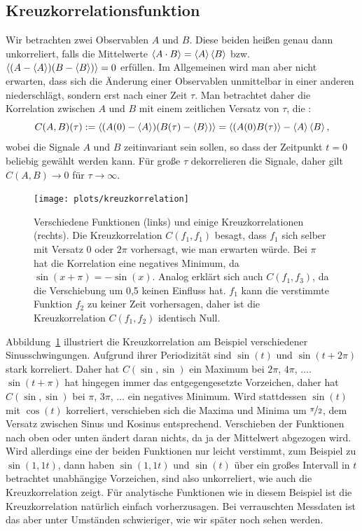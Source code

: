 \subsection{Kreuzkorrelationsfunktion}

Wir betrachten zwei Observablen $A$ und $B$. Diese
beiden heißen genau dann unkorreliert, falls die Mittelwerte
$\left\langle{A\cdot B}\right\rangle = \left\langle{A}\right\rangle\left\langle{B}\right\rangle$
bzw. $\left\langle{(A-\left\langle{A}\right\rangle)(B-\left\langle{B}\right\rangle)}\right\rangle=0$ erfüllen.  Im Allgemeinen
wird man aber nicht erwarten, dass sich die Änderung einer
Observablen unmittelbar in einer anderen niederschlägt, sondern erst
nach einer Zeit $\tau$.  Man betrachtet daher die Korrelation zwischen
$A$ und $B$ mit einem zeitlichen Versatz von $\tau$, die
\emph{}:
\begin{equation}
  \label{eq:crosscorr}
  C(A,B)(\tau) := \left\langle{(A(0)-\left\langle{A}\right\rangle)(B(\tau)-\left\langle{B}\right\rangle)}\right\rangle =
      \left\langle{(A(0)B(\tau)}\right\rangle-\left\langle{A}\right\rangle\left\langle{B}\right\rangle,
\end{equation}
wobei die Signale $A$ und $B$ zeitinvariant sein sollen, so dass der
Zeitpunkt $t=0$ beliebig gewählt werden kann. Für große $\tau$
dekorrelieren die Signale, daher gilt $C(A,B)\to 0$ für
$\tau\to\infty$.

\begin{figure}
  \centering
  \texttt{[image: plots/kreuzkorrelation]}
  \caption{Verschiedene Funktionen (links) und einige Kreuzkorrelationen (rechts).
  Die Kreuzkorrelation $C(f_1, f_1)$
  besagt, dass $f_1$ sich selber mit Versatz 0 oder $2\pi$ vorhersagt, wie man
  erwarten würde. Bei $\pi$ hat die Korrelation eine negatives Minimum, da
  $\sin(x + \pi) = -\sin(x)$. Analog erklärt sich auch $C(f_1, f_3)$, da die
  Verschiebung um 0,5 keinen Einfluss hat. $f_1$ kann die verstimmte Funktion
  $f_2$ zu keiner Zeit vorhersagen, daher ist die Kreuzkorrelation $C(f_1, f_2)$
  identisch Null. 
  }
  \label{fig:kreuzkorrelationen}
\end{figure}

Abbildung~\ref{fig:kreuzkorrelationen} illustriert die Kreuzkorrelation am Beispiel
verschiedener Sinusschwingungen. Aufgrund ihrer Periodizität sind $\sin(t)$ und $\sin(t + 2\pi)$ stark korreliert. Daher hat $C(\sin,\sin)$ ein Maximum bei $2\pi$,  $4\pi$, $\ldots$. $\sin(t+\pi)$ hat hingegen immer das entgegengesetzte Vorzeichen, daher hat $C(\sin,\sin)$ bei $\pi$, $3\pi$, $\ldots$ ein negatives Minimum. Wird stattdessen $\sin(t)$ mit $\cos(t)$ korreliert, verschieben sich die Maxima und Minima um $\nicefrac{\pi}{2}$, dem Versatz zwischen Sinus und Kosinus entsprechend. Verschieben der Funktionen nach oben oder unten ändert daran nichts, da ja der Mittelwert abgezogen wird. Wird allerdings eine der beiden Funktionen nur leicht verstimmt, zum Beispiel zu $\sin(1,1 t)$, dann haben $\sin(1,1t)$  und $\sin(t)$ über ein großes Intervall in $t$ betrachtet unabhängige Vorzeichen, sind also unkorreliert, wie auch die Kreuzkorrelation zeigt. Für analytische Funktionen wie in diesem Beispiel ist die Kreuzkorrelation natürlich einfach vorherzusagen. Bei verrauschten Messdaten ist das aber unter Umständen schwieriger, wie wir später noch sehen werden.

